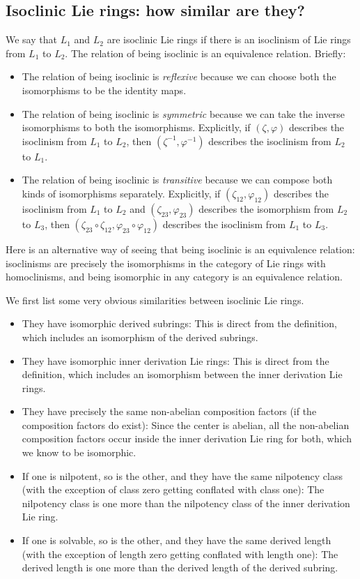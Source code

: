 \documentclass{ucetd}
\begin{document}
\subsection{Isoclinic Lie rings: how similar are they?}

We say that $L_1$ and $L_2$ are isoclinic Lie rings if there is an
isoclinism of Lie rings from $L_1$ to $L_2$. The relation of being
isoclinic is an equivalence relation. Briefly:

\begin{itemize}
\item The relation of being isoclinic is {\em reflexive} because we
  can choose both the isomorphisms to be the identity maps.
\item The relation of being isoclinic is {\em symmetric} because we
  can take the inverse isomorphisms to both the
  isomorphisms. Explicitly, if $(\zeta,\varphi)$ describes the
  isoclinism from $L_1$ to $L_2$, then $(\zeta^{-1},\varphi^{-1})$
  describes the isoclinism from $L_2$ to $L_1$.
\item The relation of being isoclinic is {\em transitive} because we
  can compose both kinds of isomorphisms separately. Explicitly, if
  $(\zeta_{12},\varphi_{12})$ describes the isoclinism from $L_1$ to
  $L_2$ and $(\zeta_{23},\varphi_{23})$ describes the isomorphism from
  $L_2$ to $L_3$, then $(\zeta_{23} \circ \zeta_{12}, \varphi_{23}
  \circ \varphi_{12})$ describes the isoclinism from $L_1$ to $L_3$.
\end{itemize}

Here is an alternative way of seeing that being isoclinic is an
equivalence relation: isoclinisms are precisely the isomorphisms in
the category of Lie rings with homoclinisms, and being isomorphic in any
category is an equivalence relation.

We first list some very obvious similarities between isoclinic Lie rings.

\begin{itemize}
\item They have isomorphic derived subrings: This is direct from the
  definition, which includes an isomorphism of the derived subrings.
\item They have isomorphic inner derivation Lie rings: This is direct
  from the definition, which includes an isomorphism between the inner
  derivation Lie rings.
\item They have precisely the same non-abelian composition factors (if
  the composition factors do exist): Since the center is abelian, all
  the non-abelian composition factors occur inside the inner
  derivation Lie ring for both, which we know to be isomorphic.
\item If one is nilpotent, so is the other, and they have the same
  nilpotency class (with the exception of class zero getting conflated
  with class one): The nilpotency class is one more than the
  nilpotency class of the inner derivation Lie ring.
\item If one is solvable, so is the other, and they have the same
  derived length (with the exception of length zero getting conflated
  with length one): The derived length is one more than the derived
  length of the derived subring.
\end{itemize}
\end{document}
